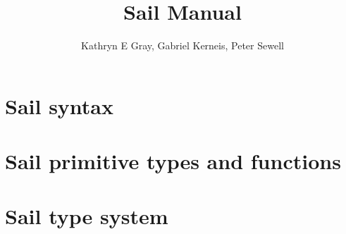 \documentclass[11pt]{article}
\begin{document}


\title{Sail Manual}
\author{Kathryn E Gray, Gabriel Kerneis, Peter Sewell}

\maketitle

\tableofcontents

\newpage

\section{Sail syntax}

\ottgrammartabular{
\ottl\ottinterrule
\ottannot\ottinterrule
\ottid\ottinterrule
\ottkid\ottinterrule
\ottbaseXXkind\ottinterrule
\ottkind\ottinterrule
\ottnexp\ottinterrule
\ottorder\ottinterrule
\ottbaseXXeffect\ottinterrule
\otteffect\ottinterrule
\otttyp\ottinterrule
\otttypXXarg\ottinterrule
\ottnXXconstraint\ottinterrule
\ottkindedXXid\ottinterrule
\ottquantXXitem\ottinterrule
\otttypquant\ottinterrule
\otttypschm\ottinterrule
\ottnameXXscmXXopt\ottinterrule
\otttypeXXdef\ottinterrule
\otttypeXXunion\ottinterrule
\ottindexXXrange\ottinterrule
\ottlit\ottinterrule
\ottsemiXXopt\ottinterrule
\ottpat\ottinterrule
\ottfpat\ottinterrule
\ottexp\ottinterrule
\ottlexp\ottinterrule
\ottfexp\ottinterrule
\ottfexps\ottinterrule
\ottoptXXdefault\ottinterrule
\ottpexp\ottinterrule
\otttannotXXopt\ottinterrule
\ottrecXXopt\ottinterrule
\otteffectXXopt\ottinterrule
\ottfuncl\ottinterrule
\ottfundef\ottinterrule
\ottletbind\ottinterrule
\ottvalXXspec\ottinterrule
\ottdefaultXXspec\ottinterrule
\ottscatteredXXdef\ottinterrule
\ottregXXid\ottinterrule
\ottaliasXXspec\ottinterrule
\ottdecXXspec\ottinterrule
\ottdef\ottinterrule
\ottdefs\ottinterrule}

\newpage
\section{Sail primitive types and functions}

\ottgrammartabular{
\ottbuiltXXinXXtypes\ottinterrule}

\ottgrammartabular{
\ottbuiltXXinXXtypeXXabbreviations\ottinterrule
\ottfunctions\ottinterrule
\ottfunctionsXXwithXXcoercions\ottinterrule}
\newpage

\section{Sail type system}
\end{document}

